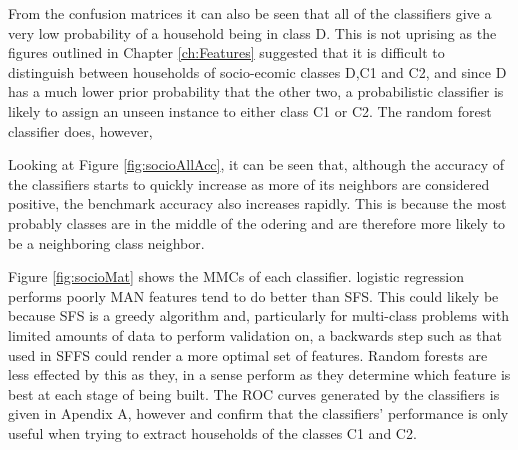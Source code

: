 From the confusion matrices it can also be seen that all of the classifiers give a very low probability of a household being in class D. This is not uprising as the figures outlined in Chapter \ref{ch:Features} suggested that it is difficult to  distinguish between households of socio-ecomic classes D,C1 and C2, and since D has a much lower prior probability that the other two, a probabilistic classifier is likely to assign an unseen instance to either class C1 or C2. The random forest classifier does, however, 

Looking at Figure \ref{fig:socioAllAcc}, it can be seen that, although the accuracy of the classifiers starts to quickly increase as more of its neighbors are considered positive, the benchmark accuracy also increases rapidly. This is because the most probably classes are in the middle of the odering and are therefore more likely to be a neighboring class neighbor.


\socioAllAcc

\socioMat

Figure \ref{fig:socioMat} shows the MMCs of each classifier. 
logistic regression performs poorly
MAN features tend to do better than SFS. This could likely be because SFS is a greedy algorithm and, particularly for multi-class problems with limited amounts of data to perform validation on,  a backwards step such as that used in SFFS could render a more optimal set of features. Random forests are less effected by this as they, in a sense perform as they determine which feature is best at each stage of being built. The ROC curves generated by the classifiers is given in Apendix A, however and confirm that the classifiers' performance is only useful when trying to extract households of the classes C1 and C2.